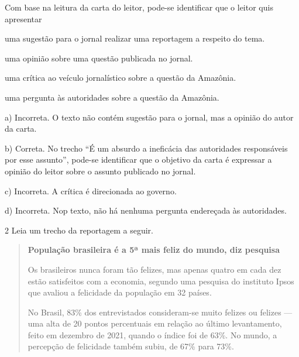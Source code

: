 \begin{escolha}
\begin{escolha}
\begin{escolha}
{{\begin{quote}
\end{quote}

Com base na leitura da carta do leitor, pode-se identificar que o leitor
quis apresentar

\begin{escolha}
\item uma sugestão para o jornal realizar uma reportagem a respeito do tema.

\item uma opinião sobre uma questão publicada no jornal.

\item uma crítica ao veículo jornalístico sobre a questão da Amazônia.

\item uma pergunta às autoridades sobre a questão da Amazônia.
\end{escolha}


a)  Incorreta. O texto não contém sugestão para o jornal, mas a
opinião do autor da carta.

b)  Correta. No trecho ``É um absurdo a ineficácia das autoridades
responsáveis por esse assunto'', pode-se identificar que o objetivo da carta
é expressar a opinião do leitor sobre o assunto publicado no jornal.

c)  Incorreta. A crítica é direcionada ao governo.

d)  Incorreta. Nop texto, não há nenhuma pergunta endereçada às autoridades.

\num{2} Leia um trecho da reportagem a seguir.

\begin{quote}
\textbf{População brasileira é a 5ª mais feliz do mundo, diz pesquisa}

Os brasileiros nunca foram tão felizes, mas apenas quatro em cada dez
estão satisfeitos com a economia, segundo uma pesquisa do instituto
Ipsos que avaliou a felicidade da população em 32 países.

No Brasil, 83\% dos entrevistados consideram-se muito felizes ou felizes
--- uma alta de 20 pontos percentuais em relação ao último levantamento,
feito em dezembro de 2021, quando o índice foi de 63\%. No mundo, a
percepção de felicidade também subiu, de 67\% para 73\%.


\end{quote}}}
\end{escolha}
\end{escolha}
\end{escolha}
